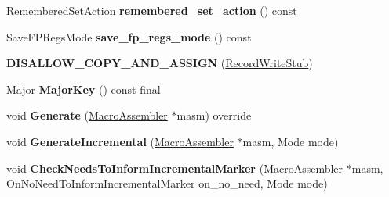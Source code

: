 \begin{DoxyCompactItemize}
\item 
Remembered\+Set\+Action {\bfseries remembered\+\_\+set\+\_\+action} () const \hypertarget{classv8_1_1internal_1_1_record_write_stub_ab333b01d325ff4e597af83c7f93bc109}{}\label{classv8_1_1internal_1_1_record_write_stub_ab333b01d325ff4e597af83c7f93bc109}

\item 
Save\+F\+P\+Regs\+Mode {\bfseries save\+\_\+fp\+\_\+regs\+\_\+mode} () const \hypertarget{classv8_1_1internal_1_1_record_write_stub_a958cf062d6f62adc812d2df9b92bd24a}{}\label{classv8_1_1internal_1_1_record_write_stub_a958cf062d6f62adc812d2df9b92bd24a}

\item 
{\bfseries D\+I\+S\+A\+L\+L\+O\+W\+\_\+\+C\+O\+P\+Y\+\_\+\+A\+N\+D\+\_\+\+A\+S\+S\+I\+GN} (\hyperlink{classv8_1_1internal_1_1_record_write_stub}{Record\+Write\+Stub})\hypertarget{classv8_1_1internal_1_1_record_write_stub_ab5fe793d232d0a1fea1b3626df883dd3}{}\label{classv8_1_1internal_1_1_record_write_stub_ab5fe793d232d0a1fea1b3626df883dd3}

\item 
Major {\bfseries Major\+Key} () const  final\hypertarget{classv8_1_1internal_1_1_record_write_stub_aa48ea86c84fbc9af6c238be1b4b8fa8d}{}\label{classv8_1_1internal_1_1_record_write_stub_aa48ea86c84fbc9af6c238be1b4b8fa8d}

\item 
void {\bfseries Generate} (\hyperlink{classv8_1_1internal_1_1_macro_assembler}{Macro\+Assembler} $\ast$masm) override\hypertarget{classv8_1_1internal_1_1_record_write_stub_a71cb55552be288a12876045441a66dca}{}\label{classv8_1_1internal_1_1_record_write_stub_a71cb55552be288a12876045441a66dca}

\item 
void {\bfseries Generate\+Incremental} (\hyperlink{classv8_1_1internal_1_1_macro_assembler}{Macro\+Assembler} $\ast$masm, Mode mode)\hypertarget{classv8_1_1internal_1_1_record_write_stub_a05cf08ed0350334ba02a2e918b42ffcc}{}\label{classv8_1_1internal_1_1_record_write_stub_a05cf08ed0350334ba02a2e918b42ffcc}

\item 
void {\bfseries Check\+Needs\+To\+Inform\+Incremental\+Marker} (\hyperlink{classv8_1_1internal_1_1_macro_assembler}{Macro\+Assembler} $\ast$masm, On\+No\+Need\+To\+Inform\+Incremental\+Marker on\+\_\+no\+\_\+need, Mode mode)\hypertarget{classv8_1_1internal_1_1_record_write_stub_aa80cd82bd6fa0cdc17b5cb2d17540d59}{}\label{classv8_1_1internal_1_1_record_write_stub_aa80cd82bd6fa0cdc17b5cb2d17540d59}


\end{DoxyCompactItemize}

